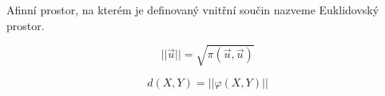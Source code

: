 \begin{definition}
    Afinní prostor, na kterém je definovaný vnitřní součin nazveme Euklidovský prostor.
\end{definition}

\begin{definition}
    $$||\vec{u}|| = \sqrt{\pi(\vec{u}, \vec{u})}$$
\end{definition}

\begin{definition}
    $$d(X, Y) = ||\varphi(X, Y)||$$
\end{definition}
